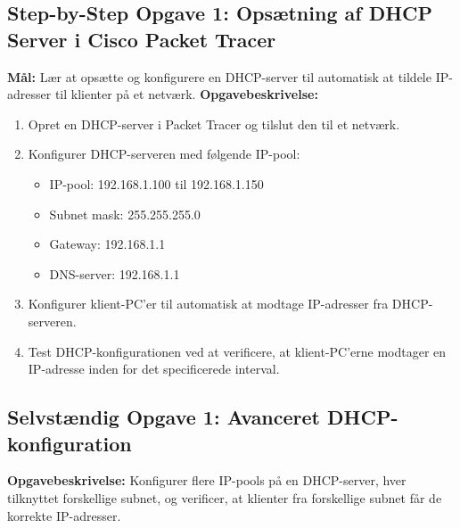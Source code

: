 \subsection*{Step-by-Step Opgave 1: Opsætning af DHCP Server i Cisco Packet Tracer}
\textbf{Mål:} Lær at opsætte og konfigurere en DHCP-server til automatisk at tildele IP-adresser til klienter på et netværk.
\newline\newline\noindent
\textbf{Opgavebeskrivelse:}
\begin{enumerate}
	\item Opret en DHCP-server i Packet Tracer og tilslut den til et netværk.
	\item Konfigurer DHCP-serveren med følgende IP-pool:
	\begin{itemize}
		\item IP-pool: 192.168.1.100 til 192.168.1.150
		\item Subnet mask: 255.255.255.0
		\item Gateway: 192.168.1.1
		\item DNS-server: 192.168.1.1
	\end{itemize}
	\item Konfigurer klient-PC'er til automatisk at modtage IP-adresser fra DHCP-serveren.
	\item Test DHCP-konfigurationen ved at verificere, at klient-PC'erne modtager en IP-adresse inden for det specificerede interval.
\end{enumerate}

\subsection*{Selvstændig Opgave 1: Avanceret DHCP-konfiguration}
\textbf{Opgavebeskrivelse:} Konfigurer flere IP-pools på en DHCP-server, hver tilknyttet forskellige subnet, og verificer, at klienter fra forskellige subnet får de korrekte IP-adresser.